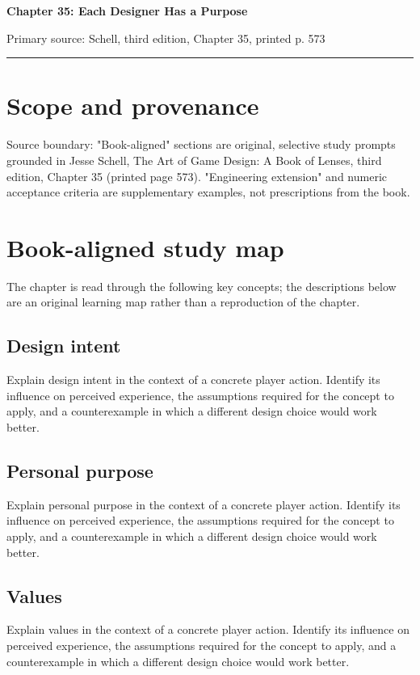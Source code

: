 \documentclass[11pt]{article}
\begin{document}
{\huge\bfseries\color{suiteblue} Chapter 35: Each Designer Has a Purpose}\par
\vspace{0.15in}
{\normalsize\color{suitegray} Primary source: Schell, third edition, Chapter 35, printed p. 573}\par
\vspace{0.15in}\hrule\vspace{0.15in}

\section{Scope and provenance}
Source boundary: "Book-aligned" sections are original, selective study prompts grounded in Jesse Schell, The Art of Game Design: A Book of Lenses, third edition, Chapter 35 (printed page 573). "Engineering extension" and numeric acceptance criteria are supplementary examples, not prescriptions from the book.


\section{Book-aligned study map}
The chapter is read through the following key concepts; the descriptions below are an original learning map rather than a reproduction of the chapter.


\subsection{Design intent}
Explain design intent in the context of a concrete player action. Identify its influence on perceived experience, the assumptions required for the concept to apply, and a counterexample in which a different design choice would work better.


\subsection{Personal purpose}
Explain personal purpose in the context of a concrete player action. Identify its influence on perceived experience, the assumptions required for the concept to apply, and a counterexample in which a different design choice would work better.


\subsection{Values}
Explain values in the context of a concrete player action. Identify its influence on perceived experience, the assumptions required for the concept to apply, and a counterexample in which a different design choice would work better.
\end{document}
